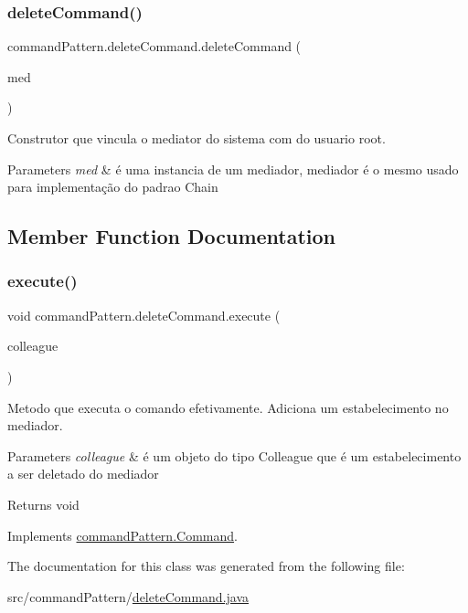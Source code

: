 \subsubsection{\texorpdfstring{deleteCommand()}{deleteCommand()}}
{\footnotesize\ttfamily command\+Pattern.\+delete\+Command.\+delete\+Command (\begin{DoxyParamCaption}\item[{\mbox{\hyperlink{classmediator_pattern_1_1_mediator_message}{Mediator\+Message}}}]{med }\end{DoxyParamCaption})}



Construtor que vincula o mediator do sistema com do usuario root. 


\begin{DoxyParams}{Parameters}
{\em med} & é uma instancia de um mediador, mediador é o mesmo usado para implementação do padrao Chain \\
\hline
\end{DoxyParams}


\subsection{Member Function Documentation}
\mbox{\label{classcommand_pattern_1_1delete_command_ab05d76bc592e6e3fb795ee6eb9956b18}} 
\subsubsection{\texorpdfstring{execute()}{execute()}}
{\footnotesize\ttfamily void command\+Pattern.\+delete\+Command.\+execute (\begin{DoxyParamCaption}\item[{\mbox{\hyperlink{classmediator_pattern_1_1_colleague}{Colleague}}}]{colleague }\end{DoxyParamCaption})}



Metodo que executa o comando efetivamente. Adiciona um estabelecimento no mediador. 


\begin{DoxyParams}{Parameters}
{\em colleague} & é um objeto do tipo Colleague que é um estabelecimento a ser deletado do mediador \\
\hline
\end{DoxyParams}
\begin{DoxyReturn}{Returns}
void 
\end{DoxyReturn}


Implements \mbox{\hyperlink{interfacecommand_pattern_1_1_command_a4e6eb0bcffccf0b3934ccd1d5727b39b}{command\+Pattern.\+Command}}.



The documentation for this class was generated from the following file\+:\begin{DoxyCompactItemize}
\item 
src/command\+Pattern/\mbox{\hyperlink{delete_command_8java}{delete\+Command.\+java}}\end{DoxyCompactItemize}
